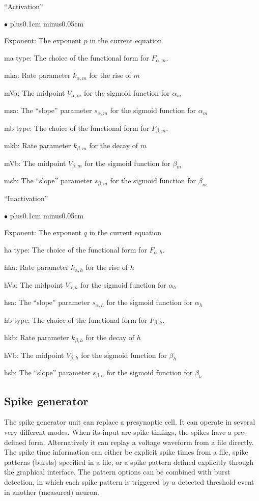 \documentclass{article}
\newenvironment{myitem}{\begin{list}{$\bullet$}{\setlength{\leftmargin}{1.1em}
\itemsep0.1cm plus0.1cm minus0.05cm
\listparindent0cm
\addtolength{\labelsep}{0.5\labelsep}
\setlength{\labelwidth}{0.8em}
\setlength{\leftmargin}{\labelwidth}
\addtolength{\leftmargin}{\labelsep}
}}{\end{list}}
\begin{document}
\noindent
``Activation''
\begin{myitem}
\item Exponent: The exponent $p$ in the current equation
\item ma type: The choice of the functional form for $F_{\alpha,m}$.
\item mka: Rate parameter $k_{\alpha,m}$ for the rise of $m$
\item mVa: The midpoint $V_{\alpha,m}$ for the sigmoid function
  for $\alpha_m$ 
\item msa: The ``slope'' parameter $s_{\alpha,m}$ for the sigmoid function
  for $\alpha_m$
\item mb type: The choice of the functional form for $F_{\beta,m}$.
\item mkb: Rate parameter $k_{\beta,m}$ for the decay of $m$
\item mVb: The midpoint $V_{\beta,m}$ for the sigmoid function
  for $\beta_m$ 
\item msb: The ``slope'' parameter $s_{\beta,m}$ for the sigmoid function
  for $\beta_m$
\end{myitem}
``Inactivation''
\begin{myitem}
\item Exponent: The exponent $q$ in the current equation
\item ha type: The choice of the functional form for $F_{\alpha,h}$.
\item hka: Rate parameter $k_{\alpha,h}$ for the rise of $h$
\item hVa: The midpoint $V_{\alpha,h}$ for the sigmoid function
  for $\alpha_h$ 
\item hsa: The ``slope'' parameter $s_{\alpha,h}$ for the sigmoid function
  for $\alpha_h$
\item hb type: The choice of the functional form for $F_{\beta,h}$.
\item hkb: Rate parameter $k_{\beta,h}$ for the decay of $h$
\item hVb: The midpoint $V_{\beta,h}$ for the sigmoid function
  for $\beta_h$ 
\item hsb: The ``slope'' parameter $s_{\beta,h}$ for the sigmoid function
  for $\beta_h$
\end{myitem}


\subsection{Spike generator} \label{spikegen}
The spike generator unit can replace a presynaptic cell. It can
operate in several very different modes. When its input are spike
timings, the spikes have a
pre-defined form. Alternatively it can replay a voltage waveform from
a file directly. The spike time information can either be explicit
spike times from a file, spike patterns (bursts) specified in a file,
or a spike pattern defined explicitly through the graphical interface.
The pattern options can be combined with burst detection, in which
each spike pattern is triggered by a detected threshold event in
another (measured) neuron.
\end{document}
